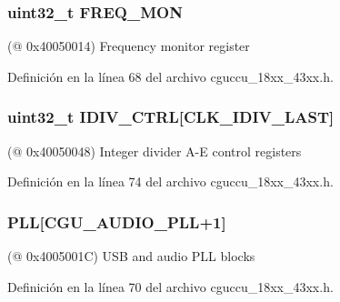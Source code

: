 \subsubsection[{\texorpdfstring{F\+R\+E\+Q\+\_\+\+M\+ON}{FREQ_MON}}]{ uint32\+\_\+t F\+R\+E\+Q\+\_\+\+M\+ON}\hypertarget{struct_l_p_c___c_g_u___t_a70422101884eff914ae3c57b819aa49f}{}\label{struct_l_p_c___c_g_u___t_a70422101884eff914ae3c57b819aa49f}
(@ 0x40050014) Frequency monitor register 

Definición en la línea 68 del archivo cguccu\+\_\+18xx\+\_\+43xx.\+h.

\subsubsection[{\texorpdfstring{I\+D\+I\+V\+\_\+\+C\+T\+RL}{IDIV_CTRL}}]{ uint32\+\_\+t I\+D\+I\+V\+\_\+\+C\+T\+RL\mbox{[}{\bf C\+L\+K\+\_\+\+I\+D\+I\+V\+\_\+\+L\+A\+ST}\mbox{]}}\hypertarget{struct_l_p_c___c_g_u___t_a8191ab22b2b6bd96178308187f7c986d}{}\label{struct_l_p_c___c_g_u___t_a8191ab22b2b6bd96178308187f7c986d}
(@ 0x40050048) Integer divider A-\/E control registers 

Definición en la línea 74 del archivo cguccu\+\_\+18xx\+\_\+43xx.\+h.

\subsubsection[{\texorpdfstring{P\+LL}{PLL}}]{ P\+LL\mbox{[}{\bf C\+G\+U\+\_\+\+A\+U\+D\+I\+O\+\_\+\+P\+LL}+1\mbox{]}}\hypertarget{struct_l_p_c___c_g_u___t_aad5b65eccb2424bc90575cafe7d38d29}{}\label{struct_l_p_c___c_g_u___t_aad5b65eccb2424bc90575cafe7d38d29}
(@ 0x4005001C) U\+SB and audio P\+LL blocks 

Definición en la línea 70 del archivo cguccu\+\_\+18xx\+\_\+43xx.\+h.

